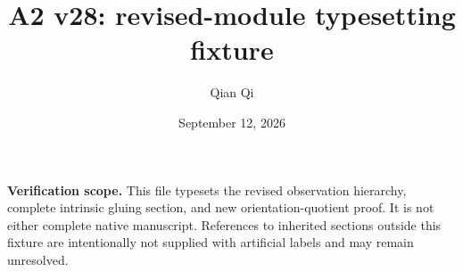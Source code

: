 
\title{A2 v28: revised-module typesetting fixture}
\author{Qian Qi}
\date{September 12, 2026}

\maketitle
\noindent\textbf{Verification scope.} This file typesets the revised observation
hierarchy, complete intrinsic gluing section, and new orientation-quotient
proof. It is not either complete native manuscript. References to inherited
sections outside this fixture are intentionally not supplied with artificial
labels and may remain unresolved.




